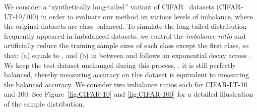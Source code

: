 We consider a ``synthetically long-tailed'' variant of CIFAR~\citep{dataset/cifar} datasets (CIFAR-LT-10/100) in order to evaluate our method on various levels of imbalance, where the original datasets are class-balanced.
To simulate the long-tailed distribution frequently appeared in imbalanced datasets, we control the \emph{imbalance ratio}  and artificially reduce the training sample sizes of each class except the first class, so that: (a)  equals to , and (b)  in between  and  follows an exponential decay across . We keep the test dataset unchanged during this process, \ie, it is still perfectly balanced, thereby measuring accuracy on this dataset is equivalent to measuring the balanced accuracy.
We consider two imbalance ratios  each for CIFAR-LT-10 and 100. See Figure~\ref{fig:CIFAR-10} and \ref{fig:CIFAR-100} for a detailed illustration of the sample distribution. 
 
